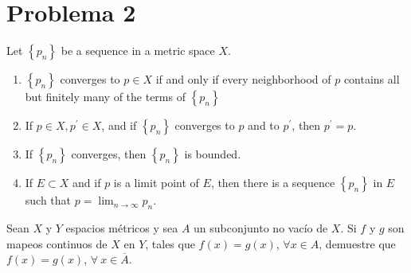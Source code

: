 \section{Problema 2}
\begin{tcolorbox}[colback=gray!15,colframe=gray!1!gray,title=Teorema 3.2 de \cite{rudin1976principles} ]
	Let $\left\{p_{n}\right\}$ be a sequence in a metric space $X$.
	\begin{enumerate}
		\item $\left\{p_{n}\right\}$ converges to $p \in X$ if and only if every neighborhood of $p$ contains all but finitely many of the terms of $\left\{p_{n}\right\}$
		\item If $p \in X, p^{\prime} \in X$, and if $\left\{p_{n}\right\}$ converges to $p$ and to $p^{\prime}$, then $p^{\prime}=p$.
		\item If $\left\{p_{n}\right\}$ converges, then $\left\{p_{n}\right\}$ is bounded.
		\item If $E \subset X$ and if $p$ is a limit point of $E$, then there is a sequence $\left\{p_{n}\right\}$ in $E$ such that $p=\lim _{n \rightarrow \infty} p_{n}$.
	\end{enumerate}
\end{tcolorbox}

Sean $X$ y $Y$ espacios métricos y sea $A$ un subconjunto no vacío de $X$. Si $f$ y $g$ son mapeos
continuos de $X$ en $Y$, tales que $f(x) = g(x)$, $\forall x\in A$, demuestre que $f(x) = g(x)$, $\forall \ x \in \overline{A} $.

